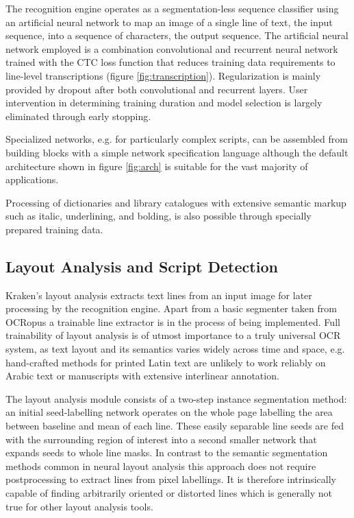 The recognition engine operates as a segmentation-less sequence classifier
using an artificial neural network to map an image of a single line of text,
the input sequence, into a sequence of characters, the output sequence. The
artificial neural network employed is a combination convolutional and recurrent
neural network trained with the CTC loss function
\cite{graves2006connectionist} that reduces training data requirements to
line-level transcriptions (figure \ref{fig:transcription}). Regularization is
mainly provided by dropout \cite{hinton2012improving} after both convolutional
and recurrent layers. User intervention in determining training duration and
model selection is largely eliminated through early stopping.

Specialized networks, e.g. for particularly complex scripts, can be assembled
from building blocks with a simple network specification language although the
default architecture shown in figure \ref{fig:arch} is suitable for the vast
majority of applications.

Processing of dictionaries and library catalogues with extensive semantic
markup such as italic, underlining, and bolding, is also possible through
specially prepared training data.

\subsection{Layout Analysis and Script Detection}

Kraken's layout analysis extracts text lines from an input image for later
processing by the recognition engine. Apart from a basic segmenter taken from
OCRopus a trainable line extractor is in the process of being implemented. Full
trainability of layout analysis is of utmost importance to a truly universal
OCR system, as text layout and its semantics varies widely across time and
space, e.g. hand-crafted methods for printed Latin text are unlikely to work
reliably on Arabic text or manuscripts with extensive interlinear annotation.

The layout analysis module consists of a two-step instance segmentation method:
an initial seed-labelling network operates on the whole page labelling the area
between baseline and mean of each line. These easily separable line seeds are
fed with the surrounding region of interest into a second smaller network that
expands seeds to whole line masks. In contrast to the semantic segmentation
methods common in neural layout analysis this approach does not require
postprocessing to extract lines from pixel labellings. It is therefore
intrinsically capable of finding arbitrarily oriented or distorted lines which
is generally not true for other layout analysis tools.

